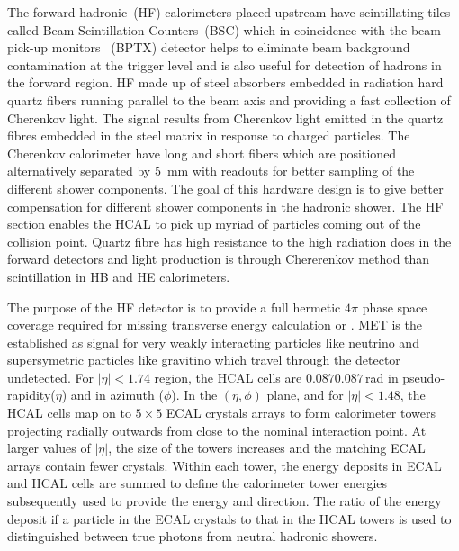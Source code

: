 The forward hadronic~(HF) calorimeters placed upstream have scintillating tiles called Beam Scintillation Counters~(BSC) which in coincidence with the beam pick-up monitors ~(BPTX) detector helps to eliminate beam background contamination at the trigger level and is also useful for detection of hadrons in the forward region. HF made up of steel absorbers embedded in radiation hard quartz fibers running parallel to the 
beam axis and providing a fast collection of Cherenkov light. The signal results from Cherenkov light emitted in the quartz 
fibres embedded in the steel matrix in response to charged particles.
The Cherenkov calorimeter have long and short fibers which are positioned alternatively separated by 5~mm with readouts for better sampling of the different shower components.
The goal of this hardware design is to give better compensation for different shower components in the hadronic shower.
The HF section enables the HCAL to pick up myriad of particles coming out of the collision point. Quartz fibre has high resistance to the high radiation does in the forward detectors and light production is through Chererenkov method than scintillation in HB and HE calorimeters.
 
The purpose of the HF detector is to provide a full hermetic $4\pi$  phase space coverage required for missing transverse energy calculation or . MET is the established as signal for very weakly interacting particles like neutrino and supersymetric particles like gravitino which travel through the detector undetected.
For $\vert \eta \vert< 1.74$ region, the HCAL cells are $0.087 0.087$\,rad  in pseudo-rapidity($\eta$) and in azimuth ($\phi$).
In the $(\eta,\phi)$ plane, and for $\vert \eta \vert < 1.48$, 
the HCAL cells map on to $5 \times 5$ ECAL crystals arrays to form calorimeter towers projecting radially outwards from close 
to the nominal interaction point. At larger values of $\vert \eta \vert$, the size of the towers increases and the matching ECAL arrays contain fewer crystals. 
Within each tower, the energy deposits in ECAL and HCAL cells are summed to define the calorimeter tower energies subsequently used to provide the energy and direction. The ratio of the energy deposit if a particle in the ECAL crystals to that in the HCAL towers is used to distinguished between true photons from neutral hadronic showers.
